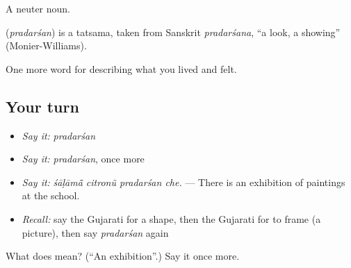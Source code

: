 A neuter noun.

\begin{cousinweb}
\textbf{} (\emph{pradarśan}) is a tatsama, taken from Sanskrit \emph{pradarśana}, \textquotedblleft{}a look, a showing\textquotedblright{} (Monier-Williams).
\end{cousinweb}

\begin{grammarlens}[title={What you've built}]
One more word for describing what you lived and felt.
\end{grammarlens}

\subsection*{Your turn}
\begin{itemize}
\raggedright
  \item \emph{Say it:} \emph{pradarśan}
  \item \emph{Say it:} \emph{pradarśan}, once more
  \item \emph{Say it:} \emph{śāḷāmā̃ citronũ pradarśan che.} — There is an exhibition of paintings at the school.
  \item \emph{Recall:} say the Gujarati for a shape, then the Gujarati for to frame (a picture), then say \emph{pradarśan} again
\end{itemize}

\begin{tcolorbox}[breakable,colback=teal!4,colframe=teal!35!black,title={Before you move on}]
What does  mean? (\textquotedblleft{}An exhibition\textquotedblright{}.) Say it once more.
\end{tcolorbox}
